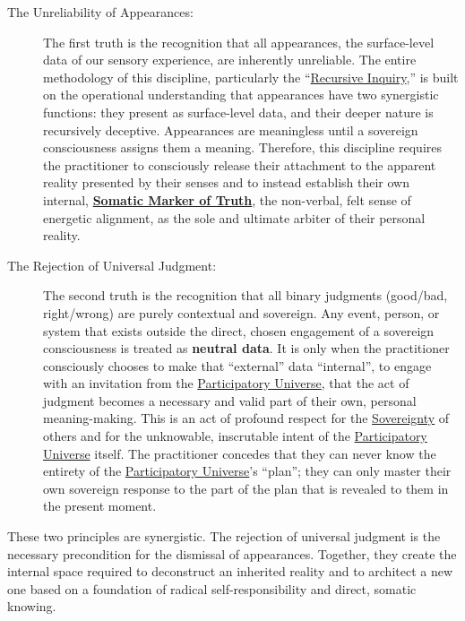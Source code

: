 \documentclass{article}
\begin{document}
\begin{description}
    \item[The Unreliability of Appearances:] The first truth is the recognition that all appearances, the surface-level data of our sensory experience, are inherently unreliable. The entire methodology of this discipline, particularly the ``\hyperlink{gloss:recursive_inquiry}{Recursive Inquiry},'' is built on the operational understanding that appearances have two synergistic functions: they present as surface-level data, and their deeper nature is recursively deceptive. Appearances are meaningless until a sovereign consciousness assigns them a meaning. Therefore, this discipline requires the practitioner to consciously release their attachment to the apparent reality presented by their senses and to instead establish their own internal, \textbf{\hyperlink{gloss:somatic_marker_of_truth}{Somatic Marker of Truth}}, the non-verbal, felt sense of energetic alignment, as the sole and ultimate arbiter of their personal reality.

    \item[The Rejection of Universal Judgment:] The second truth is the recognition that all binary judgments (good/bad, right/wrong) are purely contextual and sovereign. Any event, person, or system that exists outside the direct, chosen engagement of a sovereign consciousness is treated as \textbf{neutral data}. It is only when the practitioner consciously chooses to make that ``external'' data ``internal'', to engage with an invitation from the \hyperlink{gloss:participatory_universe}{Participatory Universe}, that the act of judgment becomes a necessary and valid part of their own, personal meaning-making. This is an act of profound respect for the \hyperlink{gloss:sovereignty}{Sovereignty} of others and for the unknowable, inscrutable intent of the \hyperlink{gloss:participatory_universe}{Participatory Universe} itself. The practitioner concedes that they can never know the entirety of the \hyperlink{gloss:participatory_universe}{Participatory Universe}'s ``plan''; they can only master their own sovereign response to the part of the plan that is revealed to them in the present moment.
\end{description}



These two principles are synergistic. The rejection of universal judgment is the necessary precondition for the dismissal of appearances. Together, they create the internal space required to deconstruct an inherited reality and to architect a new one based on a foundation of radical self-responsibility and direct, somatic knowing.
\end{document}
